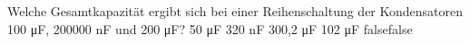     {Welche Gesamtkapazität ergibt sich bei einer Reihenschaltung der Kondensatoren 100 \si{\micro\farad}, 200000 nF und 200 \si{\micro\farad}?}
    {50 \si{\micro\farad}}
    {320 nF}
    {300,2 \si{\micro\farad}}
    {102 \si{\micro\farad}}
    {false}{false}